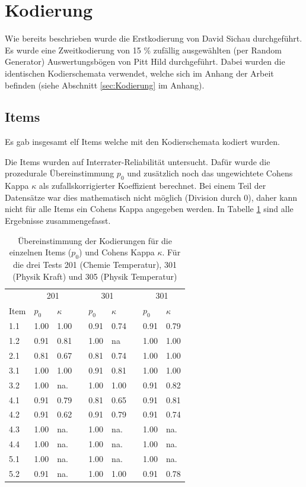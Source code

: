 \section{Kodierung}

Wie bereits beschrieben wurde die Erstkodierung von David Sichau durchgeführt. Es wurde eine Zweitkodierung von  15 \% zufällig ausgewählten (per Random Generator) Auswertungsbögen von Pitt Hild  durchgeführt. Dabei wurden die identischen Kodierschemata verwendet, welche sich im Anhang der Arbeit befinden (siehe Abschnitt \ref{sec:Kodierung} im Anhang). 

\subsection{Items}
Es gab insgesamt elf Items welche mit den Kodierschemata kodiert wurden.

Die Items wurden auf Interrater-Reliabilität untersucht. Dafür wurde die prozedurale Übereinstimmung $p_0$ und zusätzlich noch das ungewichtete Cohens Kappa $\kappa$ als zufallskorrigierter Koeffizient berechnet. Bei einem Teil der Datensätze war dies mathematisch nicht möglich (Division durch 0), daher kann nicht für alle Items ein Cohens Kappa angegeben werden. In Tabelle \ref{tab:CohenKappa} sind alle Ergebnisse zusammengefasst.



\begin{table}[htbp]
  \centering
\begin{tabular}{@{}lllllllll@{}}
\toprule   &  \multicolumn{2}{c}{201} &&  \multicolumn{2}{c}{301}  && \multicolumn{2}{c}{301}\\
 \cmidrule{2-3}  \cmidrule{5-6} \cmidrule{8-9}
Item  & $p_0$ & $\kappa$ &&  $p_0$ & $\kappa$ &&  $p_0$ & $\kappa$\\
\midrule
 1.1 & 1.00 & 1.00  && 0.91 & 0.74 && 0.91 & 0.79 \\ 
 1.2 & 0.91 & 0.81  && 1.00 & na  && 1.00 & 1.00 \\ 
 2.1 & 0.81 & 0.67  && 0.81 & 0.74  && 1.00 & 1.00\\ 
 3.1 & 1.00 & 1.00  && 0.91 & 0.81  && 1.00 & 1.00\\ 
 3.2 & 1.00 & na.  && 1.00 & 1.00  && 0.91 & 0.82\\ 
 4.1 & 0.91 & 0.79 && 0.81 & 0.65  && 0.91 & 0.81 \\ 
 4.2 & 0.91 & 0.62 && 0.91 & 0.79  && 0.91 & 0.74 \\ 
 4.3 & 1.00 & na.  && 1.00 & na.  && 1.00 & na. \\ 
 4.4 & 1.00 & na.  && 1.00 & na.  && 1.00 & na. \\ 
 5.1 & 1.00 & na.  && 1.00 & na.  && 1.00 & na. \\ 
 5.2 & 0.91 & na.  && 1.00 & 1.00  && 0.91 & 0.78 \\ 

\bottomrule

\end{tabular} 
  \caption{Übereinstimmung der Kodierungen für die einzelnen Items ($p_0$) und Cohens Kappa $\kappa$. Für die drei Tests 201 (Chemie Temperatur), 301 (Physik Kraft) und 305 (Physik Temperatur)}
  \label{tab:CohenKappa}
\end{table}

